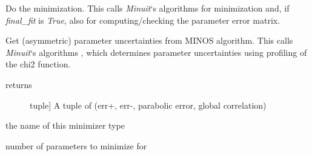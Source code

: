 \documentclass[a4paper,10pt,english]{sphinxmanual}
\begin{document}
\begin{fulllineitems}
\begin{fulllineitems}
\end{fulllineitems}


\begin{fulllineitems}
\label{module_doc:kafe.iminuit_wrapper.IMinuit.minimize}
Do the minimization. This calls \emph{Minuit}`s algorithms 
for minimization and, if \emph{final\_fit} is \emph{True}, also 
for computing/checking the parameter error matrix.

\end{fulllineitems}


\begin{fulllineitems}
\label{module_doc:kafe.iminuit_wrapper.IMinuit.minos_errors}
Get (asymmetric) parameter uncertainties from MINOS
algorithm. This calls \emph{Minuit}`s algorithms ,
which determines parameter uncertainties using profiling
of the chi2 function.
\begin{description}
\item[{returns}] \leavevmode{[}tuple{]}
A tuple of (err+, err-, parabolic error, global correlation)

\end{description}

\end{fulllineitems}


\begin{fulllineitems}
\label{module_doc:kafe.iminuit_wrapper.IMinuit.name}
the name of this minimizer type

\end{fulllineitems}


\begin{fulllineitems}
\label{module_doc:kafe.iminuit_wrapper.IMinuit.number_of_parameters}
number of parameters to minimize for

\end{fulllineitems}


\end{fulllineitems}
\end{document}
